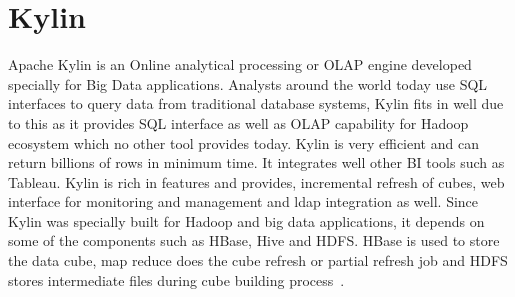 \section{Kylin}

Apache Kylin is an Online analytical processing or OLAP engine developed 
specially for Big Data applications. Analysts around the world today 
use SQL interfaces to query data from traditional database systems, 
Kylin fits in well due to this as it provides SQL interface as well 
as OLAP capability for Hadoop ecosystem which no other tool provides 
today. Kylin is very efficient and can return billions of rows in 
minimum time. It integrates well other BI tools such as Tableau. 
Kylin is rich in features and provides, incremental refresh of cubes, 
web interface for monitoring and management and ldap integration as 
well. Since Kylin was specially built for Hadoop and big data 
applications, it depends on some of the components such as HBase, 
Hive and HDFS. HBase is used to store the data cube, map reduce does 
the cube refresh or partial refresh job and HDFS stores intermediate 
files during cube building process~\cite{hid-sp18-517-ApacheKylin}.


